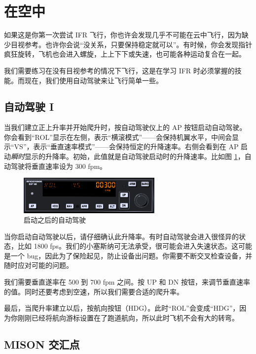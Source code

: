 \section{在空中}

如果这是你第一次尝试 IFR 飞行，你也许会发现几乎不可能在云中飞行，因为缺少目视参考。也许你会说“没关系，只要保持稳定就可以”。有时候，你会发现指针疯狂旋转，飞机也会进入螺旋，上上下下或失速，也可能各种运动复合在一起。

我们需要练习在没有目视参考的情况下飞行，这是在学习 IFR 时必须掌握的技能。而现在，我们使用自动驾驶来让飞行简单一些。

\subsection{自动驾驶 I}

当我们建立正上升率并开始爬升时，按自动驾驶仪上的 AP 按钮启动自动驾驶。你会看到“ROL”显示在左侧，表示“横滚模式”——会保持机翼水平，中间会显示“VS”，表示“垂直速率模式”——会保持恒定的升降速率。右侧会看到在 AP 启动\emph{瞬时}显示的升降率。初始，此值就是自动驾驶启动时的升降速率。比如图 \ref{fig:ap_vs}，自动驾驶将垂直速率设为 300 fpm。

\begin{figure}
  \begin{center}
    \includegraphics[width=7cm]{img/ap_vs}
    \caption{启动之后的自动驾驶}
    \label{fig:ap_vs}
  \end{center}
\end{figure}

当你启动自动驾驶以后，请仔细确认此升降率。有时自动驾驶会进入很怪异的状态，比如 1800 fps。我们的小塞斯纳可无法承受，很可能会进入失速状态。这可能是一个 bug，因此为了保险起见，防止设备出问题。你需要不断交叉检查设备，并随时应对可能的问题。

我们需要垂直遂率在 500 到 700 fpm 之间。按 UP 和 DN 按钮，来调节垂直速率的值。同时还要考虑到空速，所以我们需要合适的爬升率。

最后，当爬升率建立以后，按航向按钮（HDG）。此时“ROL”会变成“HDG”，因为你刚刚已经将航向游标设置在了跑道航向，所以此时飞机不会有大的转弯。

\subsection{MISON 交汇点}

